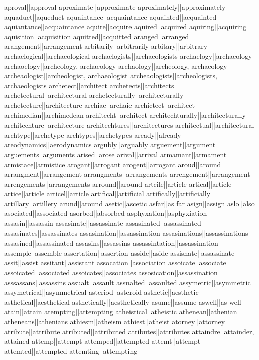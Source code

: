 aproval||approval
aproximate||approximate
aproximately||approximately
aquaduct||aqueduct
aquaintance||acquaintance
aquainted||acquainted
aquiantance||acquaintance
aquire||acquire
aquired||acquired
aquiring||acquiring
aquisition||acquisition
aquitted||acquitted
aranged||arranged
arangement||arrangement
arbitarily||arbitrarily
arbitary||arbitrary
archaelogical||archaeological
archaelogists||archaeologists
archaelogy||archaeology
archaoelogy||archeology, archaeology
archaology||archeology, archaeology
archeaologist||archeologist, archaeologist
archeaologists||archeologists, archaeologists
archetect||architect
archetects||architects
archetectural||architectural
archetecturally||architecturally
archetecture||architecture
archiac||archaic
archictect||architect
archimedian||archimedean
architecht||architect
architechturally||architecturally
architechture||architecture
architechtures||architectures
architectual||architectural
archtype||archetype
archtypes||archetypes
aready||already
areodynamics||aerodynamics
argubly||arguably
arguement||argument
arguements||arguments
arised||arose
arival||arrival
armamant||armament
armistace||armistice
arogant||arrogant
arogent||arrogant
aroud||around
arrangment||arrangement
arrangments||arrangements
arrengement||arrangement
arrengements||arrangements
arround||around
artcile||article
artical||article
artice||article
articel||article
artifical||artificial
artifically||artificially
artillary||artillery
arund||around
asetic||ascetic
asfar||as far
asign||assign
aslo||also
asociated||associated
asorbed||absorbed
asphyxation||asphyxiation
assasin||assassin
assasinate||assassinate
assasinated||assassinated
assasinates||assassinates
assasination||assassination
assasinations||assassinations
assasined||assassinated
assasins||assassins
assassintation||assassination
assemple||assemble
assertation||assertion
asside||aside
assisnate||assassinate
assit||assist
assitant||assistant
assocation||association
assoicate||associate
assoicated||associated
assoicates||associates
assosication||assassination
asssassans||assassins
assualt||assault
assualted||assaulted
assymetric||asymmetric
assymetrical||asymmetrical
asteriod||asteroid
asthetic||aesthetic
asthetical||aesthetical
asthetically||aesthetically
asume||assume
aswell||as well
atain||attain
atempting||attempting
atheistical||atheistic
athenean||athenian
atheneans||athenians
athiesm||atheism
athiest||atheist
atorney||attorney
atribute||attribute
atributed||attributed
atributes||attributes
attaindre||attainder, attained
attemp||attempt
attemped||attempted
attemt||attempt
attemted||attempted
attemting||attempting
